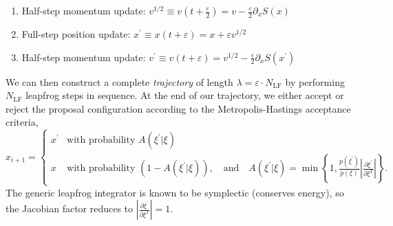 \documentclass{article} %
\begin{document}
\begin{enumerate}
   \item Half-step momentum update: \hspace{12pt}\(%
      v^{1/2} \equiv v{\left(t+\frac{\varepsilon}{2}\right)} = v-\frac{\varepsilon}{2}\partial_{x}S(x)
   \)
   \item Full-step position update: \hspace{36pt}\(%
      x^{\prime} \equiv x(t+\varepsilon) = x + \varepsilon v^{1/2}
   \)
   \item Half-step momentum update:
      \hspace{18pt} \(%
         v^{\prime} \equiv v(t+\varepsilon) = v^{1/2} - \frac{\varepsilon}{2}\partial_{x} S(x^{\prime})
   \)
\end{enumerate}
%
We can then construct a complete \emph{trajectory} of length \(\lambda = \varepsilon\cdot N_{\mathrm{LF}}\) by
performing \(N_{\mathrm{LF}}\) leapfrog steps in sequence.
%
At the end of our trajectory, we either accept or reject the proposal configuration according to the Metropolis-Hastings
acceptance criteria,
%
\begin{equation}
   x_{i+1} =
   \begin{cases}%
      x^{\prime} &\mbox{with probability } A(\xi^{\prime}|\xi) \\
      x &\mbox{with probability } (1 - A(\xi^{\prime}|\xi)), \quad\text{and}\quad%
         A(\xi^{\prime}|\xi) = \min\left\{%
            1, \frac{p(\xi^{\prime})}{p(\xi)}\left|\frac{\partial{\xi^{\prime}}}{\partial\xi^{T}}\right|%
         \right\}.
   \end{cases}
   \label{eq:mhcriteria}
\end{equation}
%
%
The generic leapfrog integrator is known to be symplectic (conserves energy), so the Jacobian factor reduces to
\(\left|\frac{\partial\xi^{\prime}}{\partial\xi^{T}}\right| = 1\). 
%
\end{document}
